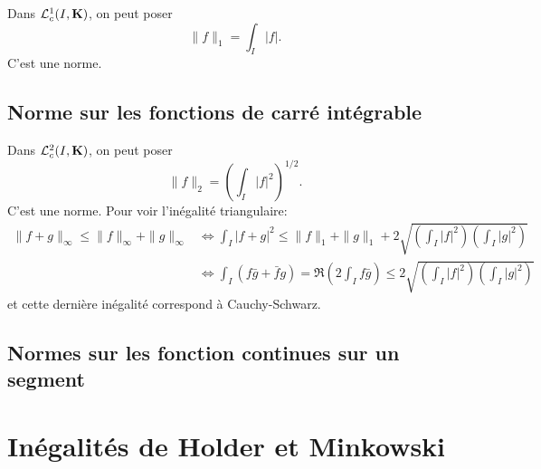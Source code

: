 Dans $\mathcal  L^1_c(I, \mathbf K)$, on peut poser \[
\|f\|_1=\int_I|f|.
\] 
C'est une norme.

\subsection{Norme sur les fonctions de carré intégrable}

Dans $\mathcal  L^2_c(I, \mathbf K)$, on peut poser \[
    \|f\|_2=\left( \int_I|f|^2 \right) ^{1 / 2}.
\] 
C'est une norme. Pour voir l'inégalité triangulaire:
\begin{align*}
    \|f+g\|_{\infty} \leq  \|f\|_\infty+\|g\|_\infty &\iff  \int_I|f+g|^2 \leq \|f\|_1+\|g\|_1 + 2 \sqrt{\left( \int_I|f|^2  \right) \left( \int_I|g|^2  \right) } \\
                                                     &\iff  \int_I(f \bar{g} + \bar{f} g)=\Re\left(2\int_If \bar{g}\right) \leq 2 \sqrt{\left( \int_I|f|^2  \right) \left( \int_I|g|^2  \right) }
\end{align*}
et cette dernière inégalité correspond à Cauchy-Schwarz.

\subsection{Normes sur les fonction continues sur un segment}


\section{Inégalités de Holder et Minkowski}

\label{sec:minkowski-holder}